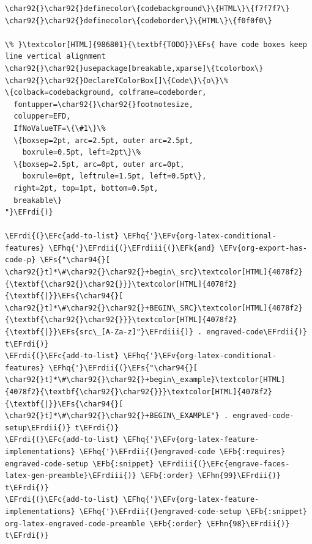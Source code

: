 \documentclass{scrartcl}
\newcommand{\EFk}[1]{\textcolor{EFk}{#1}} %
\newcommand{\EFs}[1]{\textcolor{EFs}{#1}} %
\newcommand{\EFb}[1]{\textcolor{EFb}{#1}} %
\newcommand{\EFc}[1]{\textcolor{EFc}{#1}} %
\newcommand{\EFv}[1]{\textcolor{EFv}{#1}} %
\newcommand{\EFhn}[1]{\textcolor{EFhn}{\textbf{#1}}} %
\newcommand{\EFhq}[1]{\textcolor{EFhq}{#1}} %
\newcommand{\EFrdi}[1]{\textcolor{EFrdi}{#1}} %
\newcommand{\EFrdii}[1]{\textcolor{EFrdii}{#1}} %
\newcommand{\EFrdiii}[1]{\textcolor{EFrdiii}{#1}} %
\begin{document}
\begin{Code}
\begin{Verbatim}[]
\char92{}\char92{}definecolor\{codebackground\}\{HTML\}\{f7f7f7\}
\char92{}\char92{}definecolor\{codeborder\}\{HTML\}\{f0f0f0\}

\% }\textcolor[HTML]{986801}{\textbf{TODO}}\EFs{ have code boxes keep line vertical alignment
\char92{}\char92{}usepackage[breakable,xparse]\{tcolorbox\}
\char92{}\char92{}DeclareTColorBox[]\{Code\}\{o\}\%
\{colback=codebackground, colframe=codeborder,
  fontupper=\char92{}\char92{}footnotesize,
  colupper=EFD,
  IfNoValueTF=\{\#1\}\%
  \{boxsep=2pt, arc=2.5pt, outer arc=2.5pt,
    boxrule=0.5pt, left=2pt\}\%
  \{boxsep=2.5pt, arc=0pt, outer arc=0pt,
    boxrule=0pt, leftrule=1.5pt, left=0.5pt\},
  right=2pt, top=1pt, bottom=0.5pt,
  breakable\}
"}\EFrdi{)}

\EFrdi{(}\EFc{add-to-list} \EFhq{'}\EFv{org-latex-conditional-features} \EFhq{'}\EFrdii{(}\EFrdiii{(}\EFk{and} \EFv{org-export-has-code-p} \EFs{"\char94{}[ \char92{}t]*\#\char92{}\char92{}+begin\_src}\textcolor[HTML]{4078f2}{\textbf{\char92{}\char92{}}}\textcolor[HTML]{4078f2}{\textbf{|}}\EFs{\char94{}[ \char92{}t]*\#\char92{}\char92{}+BEGIN\_SRC}\textcolor[HTML]{4078f2}{\textbf{\char92{}\char92{}}}\textcolor[HTML]{4078f2}{\textbf{|}}\EFs{src\_[A-Za-z]"}\EFrdiii{)} . engraved-code\EFrdii{)} t\EFrdi{)}
\EFrdi{(}\EFc{add-to-list} \EFhq{'}\EFv{org-latex-conditional-features} \EFhq{'}\EFrdii{(}\EFs{"\char94{}[ \char92{}t]*\#\char92{}\char92{}+begin\_example}\textcolor[HTML]{4078f2}{\textbf{\char92{}\char92{}}}\textcolor[HTML]{4078f2}{\textbf{|}}\EFs{\char94{}[ \char92{}t]*\#\char92{}\char92{}+BEGIN\_EXAMPLE"} . engraved-code-setup\EFrdii{)} t\EFrdi{)}
\EFrdi{(}\EFc{add-to-list} \EFhq{'}\EFv{org-latex-feature-implementations} \EFhq{'}\EFrdii{(}engraved-code \EFb{:requires} engraved-code-setup \EFb{:snippet} \EFrdiii{(}\EFc{engrave-faces-latex-gen-preamble}\EFrdiii{)} \EFb{:order} \EFhn{99}\EFrdii{)} t\EFrdi{)}
\EFrdi{(}\EFc{add-to-list} \EFhq{'}\EFv{org-latex-feature-implementations} \EFhq{'}\EFrdii{(}engraved-code-setup \EFb{:snippet} org-latex-engraved-code-preamble \EFb{:order} \EFhn{98}\EFrdii{)} t\EFrdi{)}


\end{Verbatim}
\end{Code}
\end{document}
